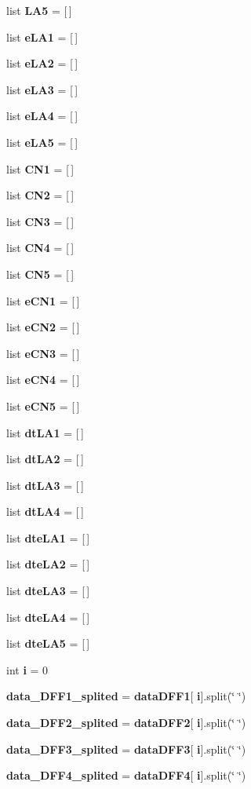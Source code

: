 \begin{DoxyCompactItemize}
\item 
list \textbf{ L\+A5} = [$\,$]
\item 
list \textbf{ e\+L\+A1} = [$\,$]
\item 
list \textbf{ e\+L\+A2} = [$\,$]
\item 
list \textbf{ e\+L\+A3} = [$\,$]
\item 
list \textbf{ e\+L\+A4} = [$\,$]
\item 
list \textbf{ e\+L\+A5} = [$\,$]
\item 
list \textbf{ C\+N1} = [$\,$]
\item 
list \textbf{ C\+N2} = [$\,$]
\item 
list \textbf{ C\+N3} = [$\,$]
\item 
list \textbf{ C\+N4} = [$\,$]
\item 
list \textbf{ C\+N5} = [$\,$]
\item 
list \textbf{ e\+C\+N1} = [$\,$]
\item 
list \textbf{ e\+C\+N2} = [$\,$]
\item 
list \textbf{ e\+C\+N3} = [$\,$]
\item 
list \textbf{ e\+C\+N4} = [$\,$]
\item 
list \textbf{ e\+C\+N5} = [$\,$]
\item 
list \textbf{ dt\+L\+A1} = [$\,$]
\item 
list \textbf{ dt\+L\+A2} = [$\,$]
\item 
list \textbf{ dt\+L\+A3} = [$\,$]
\item 
list \textbf{ dt\+L\+A4} = [$\,$]
\item 
list \textbf{ dte\+L\+A1} = [$\,$]
\item 
list \textbf{ dte\+L\+A2} = [$\,$]
\item 
list \textbf{ dte\+L\+A3} = [$\,$]
\item 
list \textbf{ dte\+L\+A4} = [$\,$]
\item 
list \textbf{ dte\+L\+A5} = [$\,$]
\item 
int \textbf{ i} = 0
\item 
\textbf{ data\+\_\+\+D\+F\+F1\+\_\+splited} = \textbf{ data\+D\+F\+F1}[\textbf{ i}].split(\char`\"{} \char`\"{})
\item 
\textbf{ data\+\_\+\+D\+F\+F2\+\_\+splited} = \textbf{ data\+D\+F\+F2}[\textbf{ i}].split(\char`\"{} \char`\"{})
\item 
\textbf{ data\+\_\+\+D\+F\+F3\+\_\+splited} = \textbf{ data\+D\+F\+F3}[\textbf{ i}].split(\char`\"{} \char`\"{})
\item 
\textbf{ data\+\_\+\+D\+F\+F4\+\_\+splited} = \textbf{ data\+D\+F\+F4}[\textbf{ i}].split(\char`\"{} \char`\"{})

\end{DoxyCompactItemize}
